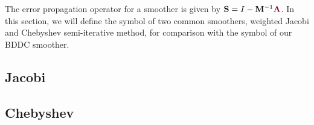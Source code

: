 The error propagation operator for a smoother is given by $\mathbf{S} = I - \mathbf{M}^{-1} {\color{burgundy}\mathbf{A}}$.
In this section, we will define the symbol of two common smoothers, weighted Jacobi and Chebyshev semi-iterative method, for comparison with the symbol of our BDDC smoother.

\subsection{Jacobi}


\subsection{Chebyshev}

